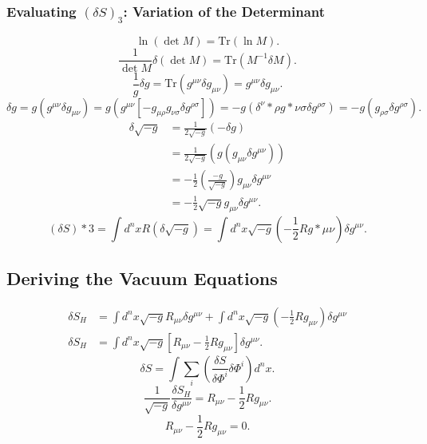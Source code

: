 \documentclass[11pt, a4paper]{report}
\begin{document}
\subsubsection*{Evaluating $(\delta S)_{3}$: Variation of the Determinant}
\begin{equation}
\ln(\det M) = \text{Tr}(\ln M).
\end{equation}
\begin{equation}
\frac{1}{\det M} \delta(\det M) = \text{Tr}(M^{-1} \delta M).
\end{equation}
\begin{equation}
\frac{1}{g} \delta g = \text{Tr}(g^{\mu\nu} \delta g_{\mu\nu}) = g^{\mu\nu}\delta g_{\mu\nu}.
\end{equation}
\begin{equation}
\delta g = g (g^{\mu\nu} \delta g_{\mu\nu}) = g (g^{\mu\nu} [-g_{\mu\rho}g_{\nu\sigma} \delta g^{\rho\sigma}]) = -g (\delta^{\nu}*{\rho} g*{\nu\sigma} \delta g^{\rho\sigma}) = -g (g_{\rho\sigma} \delta g^{\rho\sigma}).
\end{equation}
\begin{align}
\delta \sqrt{-g} &= \frac{1}{2\sqrt{-g}} (-\delta g) \nonumber \\
&= \frac{1}{2\sqrt{-g}} (g (g_{\mu\nu} \delta g^{\mu\nu})) \nonumber \\
&= -\frac{1}{2} \left( \frac{-g}{\sqrt{-g}} \right) g_{\mu\nu} \delta g^{\mu\nu} \nonumber \\
&= -\frac{1}{2} \sqrt{-g} g_{\mu\nu} \delta g^{\mu\nu}.
\end{align}
\begin{equation}
(\delta S)*{3} = \int d^{n}x R (\delta \sqrt{-g}) = \int d^{n}x \sqrt{-g} \left( -\frac{1}{2} R g*{\mu\nu} \right) \delta g^{\mu\nu}.
\end{equation}

\subsection{Deriving the Vacuum Equations}
\begin{align}
\delta S_{H} &= \int d^{n}x \sqrt{-g} R_{\mu\nu} \delta g^{\mu\nu} + \int d^{n}x \sqrt{-g} \left( -\frac{1}{2} R g_{\mu\nu} \right) \delta g^{\mu\nu} \nonumber \\
\delta S_{H} &= \int d^{n}x \sqrt{-g} \left[ R_{\mu\nu} - \frac{1}{2}R g_{\mu\nu} \right] \delta g^{\mu\nu}.
\end{align}
\begin{equation}
\delta S = \int \sum_{i} \left( \frac{\delta S}{\delta \Phi^{i}} \delta \Phi^{i} \right) d^{n}x.
\end{equation}
\begin{equation}
\frac{1}{\sqrt{-g}} \frac{\delta S_{H}}{\delta g^{\mu\nu}} = R_{\mu\nu} - \frac{1}{2}R g_{\mu\nu}.
\end{equation}
\begin{equation}
R_{\mu\nu} - \frac{1}{2}R g_{\mu\nu} = 0.
\end{equation}
\end{document}
